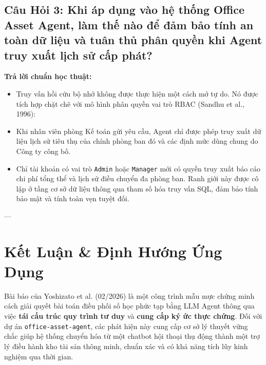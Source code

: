 \documentclass[11pt,a4paper]{article}
\begin{document}
\subsection{Câu Hỏi 3: Khi áp dụng vào hệ thống Office Asset Agent, làm thế nào để đảm bảo tính an toàn dữ liệu và tuân thủ phân quyền khi Agent truy xuất lịch sử cấp phát?}

\textbf{Trả lời chuẩn học thuật:}
\begin{itemize}[leftmargin=1.5em]
    \item Truy vấn hồi cứu bộ nhớ không được thực hiện một cách mở tự do. Nó được tích hợp chặt chẽ với mô hình phân quyền vai trò RBAC (Sandhu et al., 1996):
    \item Khi nhân viên phòng Kế toán gửi yêu cầu, Agent chỉ được phép truy xuất dữ liệu lịch sử tiêu thụ của chính phòng ban đó và các định mức dùng chung do Công ty công bố.
    \item Chỉ tài khoản có vai trò \texttt{Admin} hoặc \texttt{Manager} mới có quyền truy xuất báo cáo chi phí tổng thể và lịch sử điều chuyển đa phòng ban. Ranh giới này được cô lập ở tầng cơ sở dữ liệu thông qua tham số hóa truy vấn SQL, đảm bảo tính bảo mật và tính toàn vẹn tuyệt đối.
\end{itemize}

---

\section{Kết Luận \& Định Hướng Ứng Dụng}

Bài báo của Yoshizato et al. (02/2026) là một công trình mẫu mực chứng minh cách giải quyết bài toán điều phối số học phức tạp bằng LLM Agent thông qua việc \textbf{tái cấu trúc quy trình tư duy} và \textbf{cung cấp ký ức thực chứng}. Đối với dự án \texttt{office-asset-agent}, các phát hiện này cung cấp cơ sở lý thuyết vững chắc giúp hệ thống chuyển hóa từ một chatbot hội thoại thụ động thành một trợ lý điều hành kho tài sản thông minh, chuẩn xác và có khả năng tích lũy kinh nghiệm qua thời gian.
\end{document}
